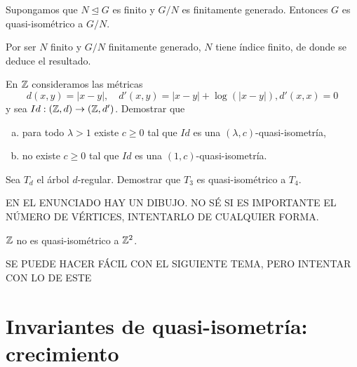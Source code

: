 \documentclass[twoside]{article}
\begin{document}
\newpage

\begin{ejercicio}{1.2}
Supongamos que $N\trianglelefteq G$ es finito y $G/N$ es finitamente generado. Entonces $G$ es quasi-isométrico a $G/N$. 
\end{ejercicio}
\begin{solucion}
Por ser $N$ finito y $G/N$ finitamente generado, $N$ tiene índice finito, de donde se deduce el resultado. 

\end{solucion}




\newpage

\begin{ejercicio}{1.3}
En $\mathbb{Z}$ consideramos las métricas
\[
d(x,y)=|x-y|,\quad d'(x,y)=|x-y|+\log(|x-y|), d'(x,x)=0
\]
y sea $Id:(\mathbb{Z},d)\to(\mathbb{Z},d')$. Demostrar que
\begin{enumerate}[a)]
\item para todo $\lambda>1$ existe $c\geq 0$ tal que $Id$ es una $(\lambda,c)$-quasi-isometría,
\item no existe $c\geq 0$ tal que $Id$ es una $(1,c)$-quasi-isometría.
\end{enumerate}
\end{ejercicio}
\begin{solucion}

\end{solucion}

\newpage

\begin{ejercicio}{1.4}
Sea $T_d$ el árbol $d$-regular. Demostrar que $T_3$ es quasi-isométrico a $T_4$.
\end{ejercicio}
\begin{solucion}
EN EL ENUNCIADO HAY UN DIBUJO. NO SÉ SI ES IMPORTANTE EL NÚMERO DE VÉRTICES, INTENTARLO DE CUALQUIER FORMA. 
\end{solucion}

\newpage

\begin{ejercicio}{1.5}
$\mathbb{Z}$ no es quasi-isométrico a $\mathbb{Z}^2$.
\end{ejercicio}
\begin{solucion}
SE PUEDE HACER FÁCIL CON EL SIGUIENTE TEMA, PERO INTENTAR CON LO DE ESTE
\end{solucion}

\newpage

\section{Invariantes de quasi-isometría: crecimiento}
\end{document}
